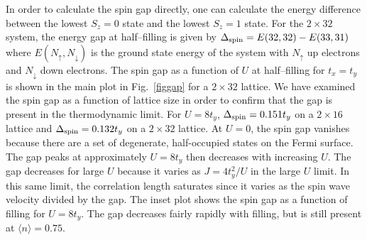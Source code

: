 In order to calculate the spin gap directly, one can calculate the
energy difference between the lowest $S_z=0$ state and the lowest $S_z=1$
state.
For the $2\times 32$ system, the energy gap at half--filling is given by
$\Delta_{\rm spin} = E(32,32) - E(33,31)$ where
$E(N_\uparrow,N_\downarrow)$ is the ground
state energy of the system with $N_\uparrow$ up electrons and
$N_\downarrow$ down electrons.
The spin gap as a function of $U$ at half--filling for $t_x = t_y$
is shown in the main plot in Fig.\ \ref{figgap} for a $2 \times 32$
lattice.
We have examined the spin gap as a function of lattice size in order
to confirm that the gap is present in the thermodynamic limit.
For $U=8t_y$, $\Delta_{\rm spin} = 0.151t_y$ on a $2\times 16$ lattice
and $\Delta_{\rm spin} = 0.132t_y$ on a $2 \times 32$ lattice.
At $U=0$, the spin gap vanishes because there are a set of
degenerate, half-occupied states on the Fermi surface.
The gap peaks at approximately $U=8t_y$ then decreases with increasing
$U$.
The gap decreases for large $U$ because it varies as $J=4t_y^2/U$
in the large $U$ limit.
In this same limit, the correlation length saturates since it varies
as the spin wave velocity divided by the gap.
The inset plot shows the spin gap as a function of filling for $U=8t_y$.
The gap decreases fairly rapidly with filling, but is still present at
$\langle n \rangle=0.75$.

